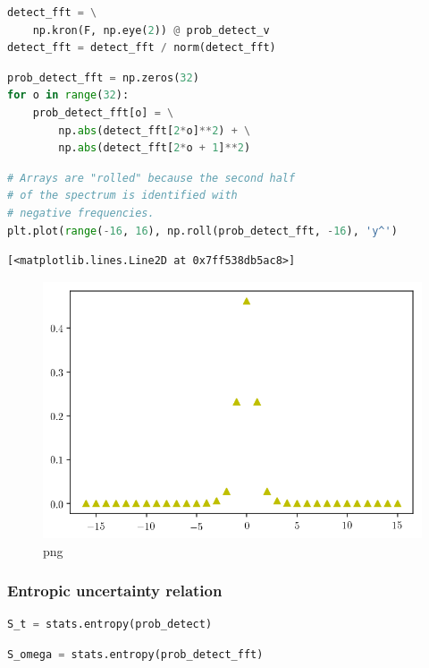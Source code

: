 \begin{lstlisting}[language=Python]
detect_fft = \
    np.kron(F, np.eye(2)) @ prob_detect_v
detect_fft = detect_fft / norm(detect_fft)
\end{lstlisting}

\begin{lstlisting}[language=Python]
prob_detect_fft = np.zeros(32)
for o in range(32):
    prob_detect_fft[o] = \
        np.abs(detect_fft[2*o]**2) + \
        np.abs(detect_fft[2*o + 1]**2) 
\end{lstlisting}

\begin{lstlisting}[language=Python]
# Arrays are "rolled" because the second half 
# of the spectrum is identified with
# negative frequencies.
plt.plot(range(-16, 16), np.roll(prob_detect_fft, -16), 'y^')
\end{lstlisting}

\begin{lstlisting}
[<matplotlib.lines.Line2D at 0x7ff538db5ac8>]
\end{lstlisting}

\begin{figure}
\centering
\includegraphics[width=0.6\linewidth]{output_102_1.png}
\caption[]{png}
\end{figure}

\hypertarget{entropic-uncertainties}{%
\subsubsection{Entropic uncertainty relation}\label{jupy:entropic-uncertainties}}

\begin{lstlisting}[language=Python]
S_t = stats.entropy(prob_detect)
\end{lstlisting}

\begin{lstlisting}[language=Python]
S_omega = stats.entropy(prob_detect_fft)
\end{lstlisting}

